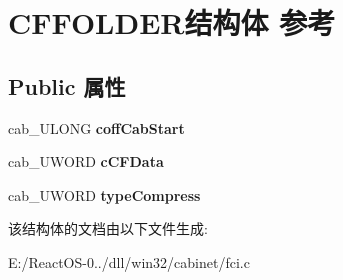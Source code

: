 \hypertarget{struct_c_f_f_o_l_d_e_r}{}\section{C\+F\+F\+O\+L\+D\+E\+R结构体 参考}
\label{struct_c_f_f_o_l_d_e_r}
\subsection*{Public 属性}
\begin{DoxyCompactItemize}
\item 
\mbox{\label{struct_c_f_f_o_l_d_e_r_a7ca3f8f2f98384c1f27c6dac8da43263}} 
cab\+\_\+\+U\+L\+O\+NG {\bfseries coff\+Cab\+Start}
\item 
\mbox{\label{struct_c_f_f_o_l_d_e_r_a453e63fa8d19aa1c0a865ab3a6e51677}} 
cab\+\_\+\+U\+W\+O\+RD {\bfseries c\+C\+F\+Data}
\item 
\mbox{\label{struct_c_f_f_o_l_d_e_r_af1f2c508919bc447e060cdcafeade432}} 
cab\+\_\+\+U\+W\+O\+RD {\bfseries type\+Compress}
\end{DoxyCompactItemize}


该结构体的文档由以下文件生成\+:\begin{DoxyCompactItemize}
\item 
E\+:/\+React\+O\+S-\/0../dll/win32/cabinet/fci.\+c\end{DoxyCompactItemize}
